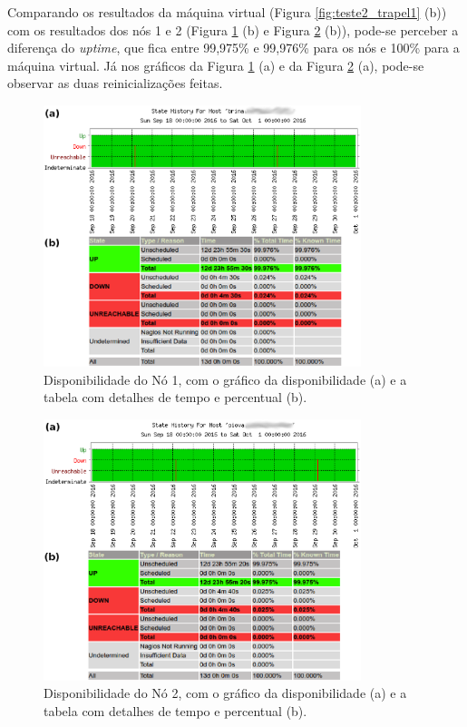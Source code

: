 Comparando os resultados da máquina virtual (Figura \ref{fig:teste2_trapel1} (b)) com os resultados dos nós 1 e 2 (Figura \ref{fig:teste2_brina1} 
(b) e Figura \ref{fig:teste2_piova1} (b)), pode-se perceber a diferença do \textit{uptime}, que fica entre 99,975\% e 99,976\% para os nós e 
100\% para a máquina virtual. Já nos gráficos da Figura \ref{fig:teste2_brina1} (a) e da Figura \ref{fig:teste2_piova1} (a), pode-se observar 
as duas reinicializações feitas.
\begin{figure}[h!]
 \centering
 \includegraphics[width=350px]{img/teste2_brina1.eps}
 \caption{Disponibilidade do Nó 1, com o gráfico da disponibilidade (a) e a tabela com detalhes de tempo e percentual (b).}
 \label{fig:teste2_brina1}
\end{figure}

\begin{figure}[h!]
 \centering
 \includegraphics[width=350px]{img/teste2_piova1.eps}
 \caption{Disponibilidade do Nó 2, com o gráfico da disponibilidade (a) e a tabela com detalhes de tempo e percentual (b).}
 \label{fig:teste2_piova1}
\end{figure}

